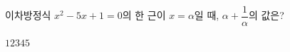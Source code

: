 이차방정식 $x^2-5x+1=0$의 한 근이 $x=\alpha$일 때, $\alpha+\dfrac{1}{\alpha}$의 값은?
\begin{choices32}{$1$}{$2$}{$3$}{$4$}{$5$}\end{choices32}
